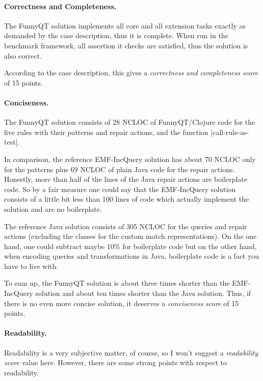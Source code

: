 \documentclass[submission]{eptcs}
\newcommand{\code}{\clojureinline}
\begin{document}
\paragraph{Correctness and Completeness.}

The FunnyQT solution implements all core and all extension tasks exactly as
demanded by the case description, thus it is complete.  When run in the
benchmark framework, all assertion it checks are satisfied, thus the solution
is also correct.

According to the case description, this gives a \emph{correctness and
  completeness score} of 15 points.

\paragraph{Conciseness.}

The FunnyQT solution consists of 28 NCLOC of FunnyQT/Clojure code for the five
rules with their patterns and repair actions, and the function
\code|call-rule-as-test|.

In comparison, the reference EMF-IncQuery solution has about 70 NCLOC only for
the patterns plus 69 NCLOC of plain Java code for the repair actions.
Honestly, more than half of the lines of the Java repair actions are
boilerplate code.  So by a fair measure one could say that the EMF-IncQuery
solution consists of a little bit less than 100 lines of code which actually
implement the solution and are no boilerplate.

The reference Java solution consists of 305 NCLOC for the queries and repair
actions (excluding the classes for the custom match representations).  On the
one hand, one could subtract maybe 10\% for boilerplate code but on the other
hand, when encoding queries and transformations in Java, boilerplate code is a
fact you have to live with.

To sum up, the FunnyQT solution is about three times shorter than the
EMF-IncQuery solution and about ten times shorter than the Java solution.
Thus, if there is no even more concise solution, it deserves a
\emph{conciseness score} of 15 points.

\paragraph{Readability.}

Readability is a very subjective matter, of course, so I won't suggest a
\emph{readability score} value here.  However, there are some strong points
with respect to readability.
\end{document}
